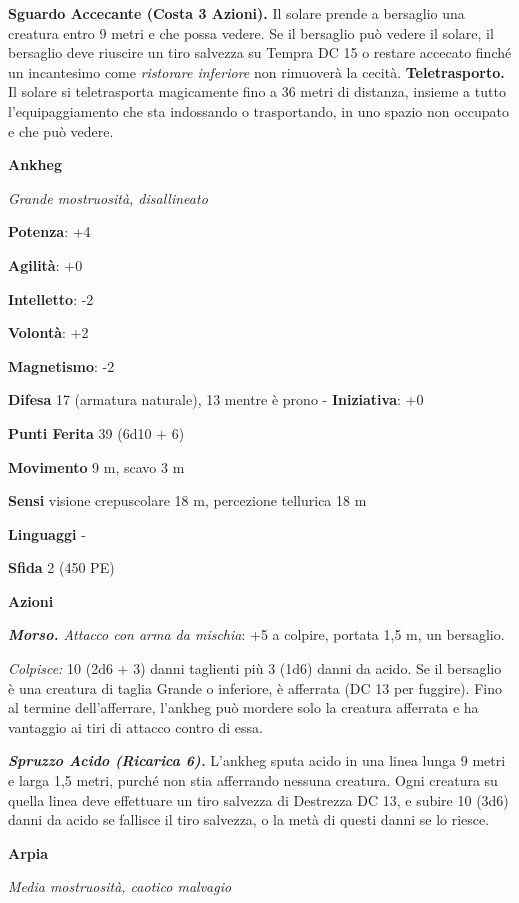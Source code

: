 \begin{multicols}{2}
\textbf{Sguardo Accecante (Costa 3 Azioni).} Il solare prende a
bersaglio una creatura entro 9 metri e che possa vedere. Se il bersaglio
può vedere il solare, il bersaglio deve riuscire un tiro salvezza su Tempra DC 15 o restare accecato finché un incantesimo come
\emph{ristorare inferiore} non rimuoverà la cecità.
\textbf{Teletrasporto.} Il solare si teletrasporta magicamente fino a 36
metri di distanza, insieme a tutto l'equipaggiamento che sta indossando
o trasportando, in uno spazio non occupato e che può vedere.



\textbf{Ankheg}

\emph{Grande mostruosità, disallineato}

\textbf{Potenza}: +4

\textbf{Agilità}: +0

\textbf{Intelletto}: -2

\textbf{Volontà}: +2

\textbf{Magnetismo}: -2

\textbf{Difesa} 17 (armatura naturale), 13 mentre è prono - \textbf{Iniziativa}: +0

\textbf{Punti Ferita} 39 (6d10 + 6)

\textbf{Movimento} 9 m, scavo 3 m

\textbf{Sensi} visione crepuscolare 18 m, percezione tellurica 18 m

\textbf{Linguaggi} -

\textbf{Sfida} 2 (450 PE)

\textbf{Azioni}

\emph{\textbf{Morso.} Attacco con arma da mischia}: +5 a colpire,
portata 1,5 m, un bersaglio.

\emph{Colpisce:} 10 (2d6 + 3) danni taglienti più 3 (1d6) danni da
acido. Se il bersaglio è una creatura di taglia Grande o inferiore, è
afferrata (DC 13 per fuggire). Fino al termine dell'afferrare, l'ankheg
può mordere solo la creatura afferrata e ha vantaggio ai tiri di attacco
contro di essa.

\emph{\textbf{Spruzzo Acido (Ricarica 6).}} L'ankheg sputa acido in una
linea lunga 9 metri e larga 1,5 metri, purché non stia afferrando
nessuna creatura. Ogni creatura su quella linea deve effettuare un tiro
salvezza di Destrezza DC 13, e subire 10 (3d6) danni da acido se
fallisce il tiro salvezza, o la metà di questi danni se lo riesce.

\textbf{Arpia}

\emph{Media mostruosità, caotico malvagio}


\end{multicols}
